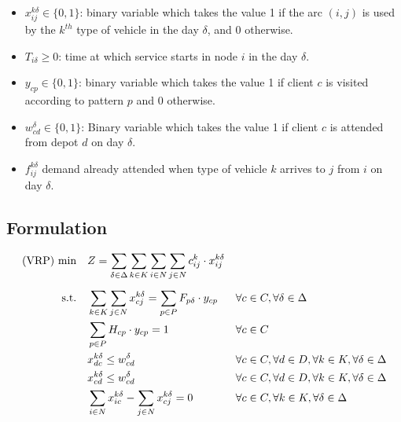 \documentclass[preprint,review,12pt]{elsarticle}
\begin{document}
\begin{itemize}
	\item  $x_{ij}^{k\delta}  \in  \{ 0,1 \}$: binary variable which takes the value 1 if the arc $(i,j)$ is used by the $k^{th}$ type of vehicle in the day $\delta$, and 0 otherwise. 
	\item $T_{i\delta} \geq 0$: time at which service starts in node $i$ in the day $\delta$. 
	\item $y_{cp} \in  \{ 0,1 \}$: binary variable which takes the value 1 if client $c$ is visited according to pattern $p$ and 0 otherwise.
	\item  $w_{cd}^\delta \in  \{0,1\}$: Binary variable which takes the value 1 if client $c$ is attended from depot $d$ on day $\delta$.
	\item $f_{ij}^{k\delta}$ demand already attended when type of vehicle $k$ arrives to $j$ from $i$ on day $\delta$.
\end{itemize}

\subsection{Formulation}

\begin{align}
	\text{(VRP) min} \quad      & Z = \sum\limits_{\delta\in \Delta} \sum\limits_{k\in K}\sum\limits_{i\in N}\sum\limits_{j\in N} c_{ij}^k \cdot x_{ij}^{k\delta}    && \label{PCVRP_FObj}    \\[5pt]
	\noindent \text{s.t.} \quad & \sum\limits_{k \in K}\sum\limits_{j \in N} x_{cj}^{k\delta} = \sum\limits_{p \in P} F_{p\delta} \cdot y_{cp}    && \text{\hspace{-0cm}} \forall c \in C, \forall \delta \in \Delta \label{PCVRP_Service} \\
	& \sum\limits_{p \in P} H_{cp} \cdot y_{cp} = 1                 && \text{\hspace{-0cm}} \forall c \in C  \label{PCVRP_Freq} \\
	& x_{dc}^{k\delta} \leq w_{cd}^\delta && \text{\hspace{-0cm}} \forall c \in C, \forall d \in D, \forall k \in K, \forall \delta \in \Delta \label{PCVRP_StartRoute} \\
	& x_{cd}^{k\delta} \leq w_{cd}^\delta && \text{\hspace{-0cm}} \forall c \in C, \forall d \in D, \forall k \in K, \forall \delta \in \Delta \label{PCVRP_EndRoute} \\
	& \sum\limits_{i \in N}x_{ic}^{k\delta} - \sum\limits_{j \in N}x_{cj}^{k\delta} = 0             && \text{\hspace{-0cm}} \forall c \in C,\forall k \in K, \forall \delta \in \Delta \label{PCVRP_Balance}
\end{align}
\end{document}
